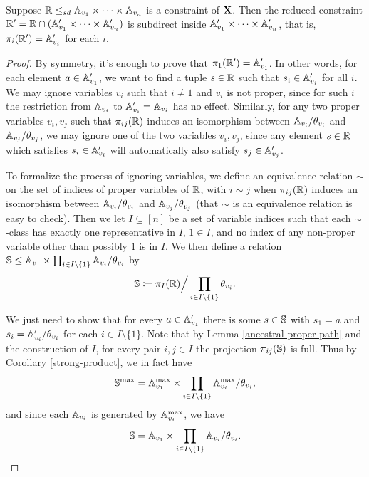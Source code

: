 \documentclass[letterpaper,11pt]{article}
\begin{document}
\begin{lem}\label{ancestral-red-arc} Suppose $\mathbb{R} \le_{sd} \mathbb{A}_{v_1} \times \cdots \times \mathbb{A}_{v_n}$ is a constraint of $\mathbf{X}$. Then the reduced constraint $\mathbb{R}' = \mathbb{R} \cap (\mathbb{A}_{v_1}' \times \cdots \times \mathbb{A}_{v_n}')$ is subdirect inside $\mathbb{A}_{v_1}' \times \cdots \times \mathbb{A}_{v_n}'$, that is, $\pi_i(\mathbb{R}') = \mathbb{A}_{v_i}'$ for each $i$.
\end{lem}
\begin{proof} By symmetry, it's enough to prove that $\pi_1(\mathbb{R}') = \mathbb{A}_{v_1}'$. In other words, for each element $a \in \mathbb{A}_{v_1}'$, we want to find a tuple $s \in \mathbb{R}$ such that $s_i \in \mathbb{A}_{v_i}'$ for all $i$. We may ignore variables $v_i$ such that $i \ne 1$ and $v_i$ is not proper, since for such $i$ the restriction from $\mathbb{A}_{v_i}$ to $\mathbb{A}_{v_i}' = \mathbb{A}_{v_i}$ has no effect. Similarly, for any two proper variables $v_i, v_j$ such that $\pi_{ij}(\mathbb{R})$ induces an isomorphism between $\mathbb{A}_{v_i}/\theta_{v_i}$ and $\mathbb{A}_{v_j}/\theta_{v_j}$, we may ignore one of the two variables $v_i, v_j$, since any element $s \in \mathbb{R}$ which satisfies $s_i \in \mathbb{A}_{v_i}'$ will automatically also satisfy $s_j \in \mathbb{A}_{v_j}'$.

To formalize the process of ignoring variables, we define an equivalence relation $\sim$ on the set of indices of proper variables of $\mathbb{R}$, with $i \sim j$ when $\pi_{ij}(\mathbb{R})$ induces an isomorphism between $\mathbb{A}_{v_i}/\theta_{v_i}$ and $\mathbb{A}_{v_j}/\theta_{v_j}$ (that $\sim$ is an equivalence relation is easy to check). Then we let $I \subseteq [n]$ be a set of variable indices such that each $\sim$-class has exactly one representative in $I$, $1 \in I$, and no index of any non-proper variable other than possibly $1$ is in $I$. We then define a relation $\mathbb{S} \le \mathbb{A}_{v_1} \times \prod_{i \in I \setminus\{1\}} \mathbb{A}_{v_i}/\theta_{v_i}$ by
\[
\mathbb{S} \coloneqq \pi_I(\mathbb{R})\Big/\prod_{i \in I \setminus\{1\}} \theta_{v_i}.
\]

We just need to show that for every $a \in \mathbb{A}_{v_1}'$ there is some $s \in \mathbb{S}$ with $s_1 = a$ and $s_i = \mathbb{A}_{v_i}'/\theta_{v_i}$ for each $i \in I \setminus\{1\}$. Note that by Lemma \ref{ancestral-proper-path} and the construction of $I$, for every pair $i,j \in I$ the projection $\pi_{ij}(\mathbb{S})$ is full. Thus by Corollary \ref{strong-product}, we in fact have
\[
\mathbb{S}^{\max} = \mathbb{A}_{v_1}^{\max} \times \prod_{i \in I \setminus\{1\}} \mathbb{A}_{v_i}^{\max}/\theta_{v_i},
\]
and since each $\mathbb{A}_{v_i}$ is generated by $\mathbb{A}_{v_i}^{\max}$, we have
\[
\mathbb{S} = \mathbb{A}_{v_1} \times \prod_{i \in I \setminus\{1\}} \mathbb{A}_{v_i}/\theta_{v_i}.\qedhere
\]
\end{proof}
\end{document}
